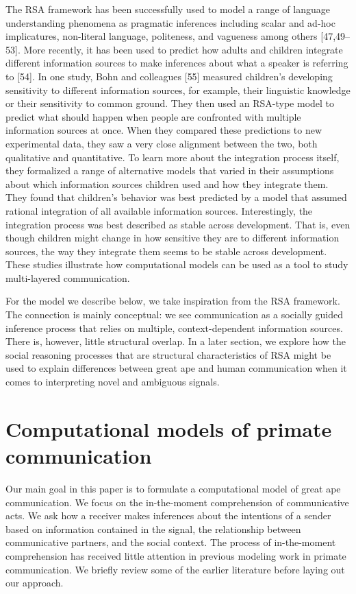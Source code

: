 \documentclass[
  english,
  man,floatsintext]{apa6}
\begin{document}
The RSA framework has been successfully used to model a range of language understanding phenomena as pragmatic inferences including scalar and ad-hoc implicatures, non-literal language, politeness, and vagueness among others {[}47,49--53{]}. More recently, it has been used to predict how adults and children integrate different information sources to make inferences about what a speaker is referring to {[}54{]}. In one study, Bohn and colleagues {[}55{]} measured children's developing sensitivity to different information sources, for example, their linguistic knowledge or their sensitivity to common ground. They then used an RSA-type model to predict what should happen when people are confronted with multiple information sources at once. When they compared these predictions to new experimental data, they saw a very close alignment between the two, both qualitative and quantitative. To learn more about the integration process itself, they formalized a range of alternative models that varied in their assumptions about which information sources children used and how they integrate them. They found that children's behavior was best predicted by a model that assumed rational integration of all available information sources. Interestingly, the integration process was best described as stable across development. That is, even though children might change in how sensitive they are to different information sources, the way they integrate them seems to be stable across development. These studies illustrate how computational models can be used as a tool to study multi-layered communication.

For the model we describe below, we take inspiration from the RSA framework. The connection is mainly conceptual: we see communication as a socially guided inference process that relies on multiple, context-dependent information sources. There is, however, little structural overlap. In a later section, we explore how the social reasoning processes that are structural characteristics of RSA might be used to explain differences between great ape and human communication when it comes to interpreting novel and ambiguous signals.

\hypertarget{computational-models-of-primate-communication}{%
\section{Computational models of primate communication}\label{computational-models-of-primate-communication}}

Our main goal in this paper is to formulate a computational model of great ape communication. We focus on the in-the-moment comprehension of communicative acts. We ask how a receiver makes inferences about the intentions of a sender based on information contained in the signal, the relationship between communicative partners, and the social context. The process of in-the-moment comprehension has received little attention in previous modeling work in primate communication. We briefly review some of the earlier literature before laying out our approach.
\end{document}
